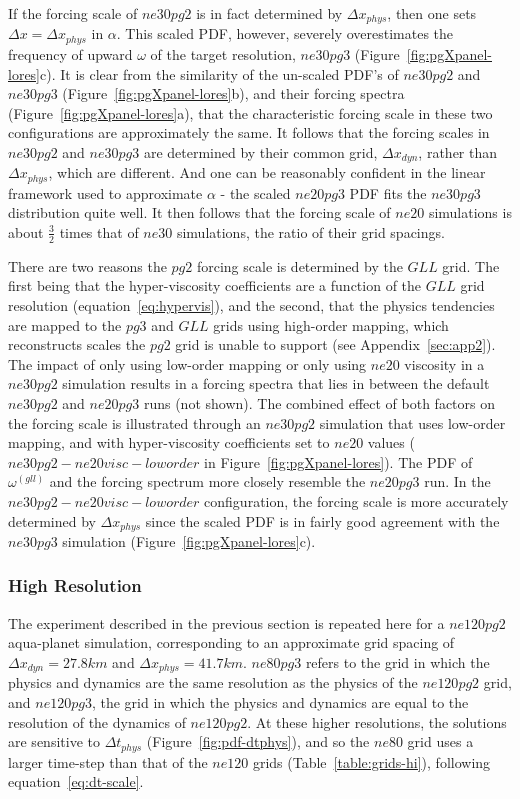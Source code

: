 \documentclass[draft,linenumbers]{agujournal}
\begin{document}
If the forcing scale of $ne30pg2$ is in fact determined by $\Delta x_{phys}$, then one sets $\Delta x = \Delta x_{phys}$ in $\alpha$. This scaled PDF, however, severely overestimates the frequency of upward $\omega$ of the target resolution, $ne30pg3$ (Figure~\ref{fig:pgXpanel-lores}c). It is clear from the similarity of the un-scaled PDF's of $ne30pg2$ and $ne30pg3$ (Figure~\ref{fig:pgXpanel-lores}b), and their forcing spectra (Figure~\ref{fig:pgXpanel-lores}a), that the characteristic forcing scale in these two configurations are approximately the same. It follows that the forcing scales in $ne30pg2$ and $ne30pg3$ are determined by their common grid, $\Delta x_{dyn}$, rather than $\Delta x_{phys}$, which are different. And one can be reasonably confident in the linear framework used to approximate $\alpha$ - the scaled $ne20pg3$ PDF fits the $ne30pg3$ distribution quite well. It then follows that the forcing scale of $ne20$ simulations is about $\frac{3}{2}$ times that of $ne30$ simulations, the ratio of their grid spacings.

There are two reasons the $pg2$ forcing scale is determined by the $GLL$ grid. The first being that the hyper-viscosity coefficients are a function of the $GLL$ grid resolution (equation~\eqref{eq:hypervis}), and the second, that the physics tendencies are mapped to the $pg3$ and $GLL$ grids using high-order mapping, which reconstructs scales the $pg2$ grid is unable to support (see Appendix~\ref{sec:app2}). The impact of only using low-order mapping or only using $ne20$ viscosity in a $ne30pg2$ simulation results in a forcing spectra that lies in between the default $ne30pg2$ and $ne20pg3$ runs (not shown). The combined effect of both factors on the forcing scale is illustrated through an $ne30pg2$ simulation that uses low-order mapping, and with hyper-viscosity coefficients set to $ne20$ values ($ne30pg2-ne20visc-loworder$ in Figure~\ref{fig:pgXpanel-lores}). The PDF of $\omega^{(gll)}$ and the forcing spectrum more closely resemble the $ne20pg3$ run. In the $ne30pg2-ne20visc-loworder$ configuration, the forcing scale is more accurately determined by $\Delta x_{phys}$ since the scaled PDF is in fairly good agreement with the $ne30pg3$ simulation (Figure~\ref{fig:pgXpanel-lores}c).

\subsubsection{High Resolution}\label{sec:hires}

The experiment described in the previous section is repeated here for a $ne120pg2$ aqua-planet simulation, corresponding to an approximate grid spacing of $\Delta x_{dyn} = 27.8km$ and $\Delta x_{phys} = 41.7km$. $ne80pg3$ refers to the grid in which the physics and dynamics are the same resolution as the physics of the $ne120pg2$ grid, and $ne120pg3$, the grid in which the physics and dynamics are equal to the resolution of the dynamics of $ne120pg2$. At these higher resolutions, the solutions are sensitive to $\Delta t_{phys}$ (Figure~\ref{fig:pdf-dtphys}), and so the $ne80$ grid uses a larger time-step than that of the $ne120$ grids (Table~\ref{table:grids-hi}), following equation~\eqref{eq:dt-scale}.
\end{document}
